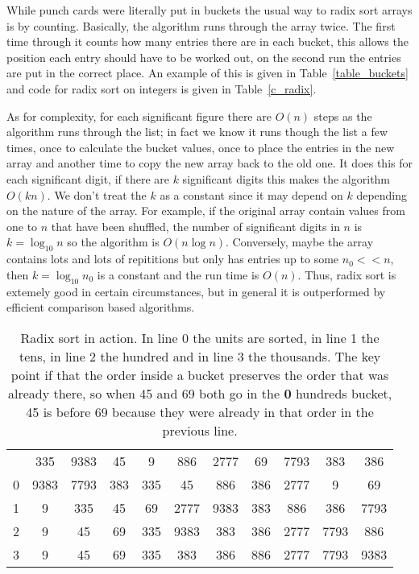 \documentclass[11pt,a4paper]{scrartcl}
\begin{document}
While punch cards were literally put in buckets the usual way to radix
sort arrays is by counting. Basically, the algorithm runs through the
array twice. The first time through it counts how many entries there
are in each bucket, this allows the position each entry should have to
be worked out, on the second run the entries are put in the correct
place. An example of this is given in Table~\ref{table_buckets} and
code for radix sort on integers is given in Table~\ref{c_radix}.

As for complexity, for each significant figure there are $O(n)$ steps
as the algorithm runs through the list; in fact we know it runs though
the list a few times, once to calculate the bucket values, once to
place the entries in the new array and another time to copy the new
array back to the old one. It does this for each significant digit, if
there are $k$ significant digits this makes the algorithm $O(kn)$. We
don't treat the $k$ as a constant since it may depend on $k$ depending
on the nature of the array. For example, if the original array contain
values from one to $n$ that have been shuffled, the number of
significant digits in $n$ is $k=\log_{10}n$ so the algorithm is
$O(n\log{n})$. Conversely, maybe the array contains lots and lots of
repititions but only has entries up to some $n_0<<n$, then
$k=\log_{10}n_0$ is a constant and the run time is $O(n)$. Thus, radix
sort is extemely good in certain circumstances, but in general it is
outperformed by efficient comparison based algorithms.

\begin{table}
\begin{tabular}{c|cccccccccc}
&335&9383 &45 &9&886&2777&69&7793&383&386\\
0&9383&7793&383&335&45&886&386&2777&9&69\\
1&9&335&45&69&2777&9383&383&886&386&7793\\
2&9&45&69&335&9383&383&386&2777&7793&886\\
3&9&45&69&335&383&386&886&2777&7793&9383
\end{tabular}
\caption{Radix sort in action. In line 0 the units are sorted, in line
  1 the tens, in line 2 the hundred and in line 3 the thousands. The
  key point if that the order inside a bucket preserves the order that
  was already there, so when 45 and 69 both go in the {\bf 0} hundreds
  bucket, 45 is before 69 because they were already in that order in
  the previous line.\label{table_radix}}
\end{table}
\end{document}
